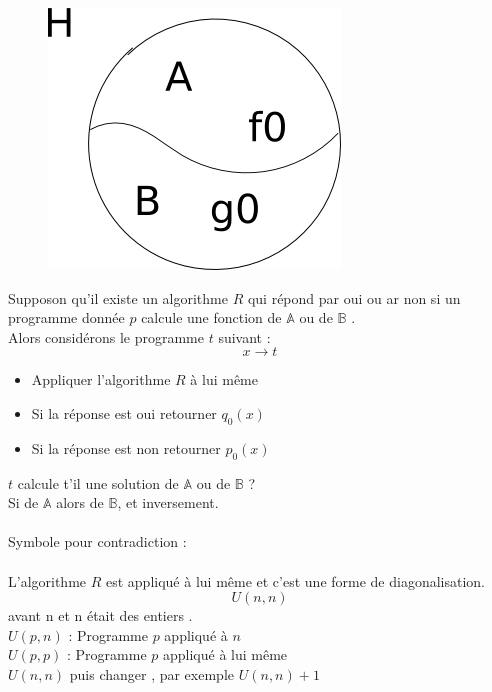 \documentclass[base.tex]{subfiles}
\begin{document}
      \begin{figure}[!h]
         \centering
         \includegraphics[scale=0.3]{rice}
      \end{figure}

Supposon qu'il existe un algorithme $R$ qui répond par oui ou ar non si un programme donnée $p$ calcule une fonction de $\mathbb{A}$ ou de $\mathbb{B}$ .\\
Alors considérons le programme $t$ suivant :
\[x\rightarrow t\]
\begin{itemize}
\item Appliquer l'algorithme $R$ à lui même
\item Si la réponse est oui retourner $q_0(x)$
\item Si la réponse est non retourner $p_0(x)$
\end{itemize}
$t$ calcule t'il une solution de $\mathbb{A}$ ou de $\mathbb{B}$ ?\\
Si de $\mathbb{A}$ alors de $\mathbb{B}$, et inversement.\\
\\
Symbole pour contradiction :
\\
\\
L'algorithme $R$ est appliqué à lui même et c'est une forme de diagonalisation.
\[U(n,n)\]
avant n et n était des entiers .\\
$U(p,n)$ : Programme $p$ appliqué à $n$\\
$U(p,p)$ : Programme $p$ appliqué à lui même \\
$U(n,n)$ puis changer , par exemple $U(n,n)+1$
\end{document}
